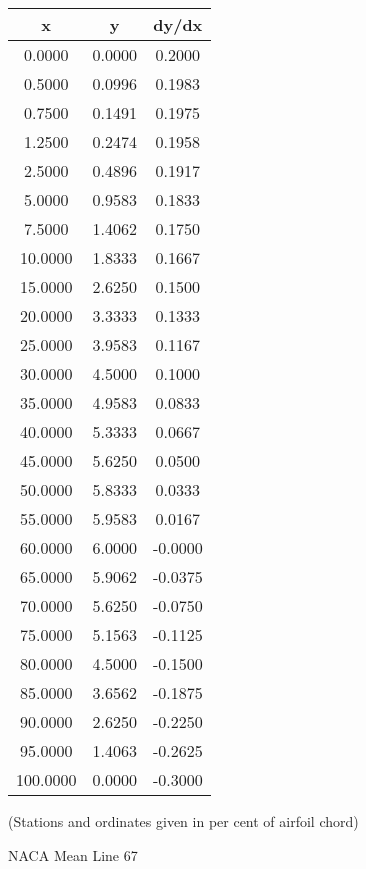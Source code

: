 \documentclass[11pt]{book}
\begin{document}
 \vspace{8mm}
 \begin{tabular}{|c|c|c|}  \hline
 x & y & dy/dx \\
 \hline
0.0000 & 0.0000 & 0.2000 \\
0.5000 & 0.0996 & 0.1983 \\
0.7500 & 0.1491 & 0.1975 \\
1.2500 & 0.2474 & 0.1958 \\
2.5000 & 0.4896 & 0.1917 \\
5.0000 & 0.9583 & 0.1833 \\
7.5000 & 1.4062 & 0.1750 \\
10.0000 & 1.8333 & 0.1667 \\
15.0000 & 2.6250 & 0.1500 \\
20.0000 & 3.3333 & 0.1333 \\
25.0000 & 3.9583 & 0.1167 \\
30.0000 & 4.5000 & 0.1000 \\
35.0000 & 4.9583 & 0.0833 \\
40.0000 & 5.3333 & 0.0667 \\
45.0000 & 5.6250 & 0.0500 \\
50.0000 & 5.8333 & 0.0333 \\
55.0000 & 5.9583 & 0.0167 \\
60.0000 & 6.0000 & -0.0000 \\
65.0000 & 5.9062 & -0.0375 \\
70.0000 & 5.6250 & -0.0750 \\
75.0000 & 5.1563 & -0.1125 \\
80.0000 & 4.5000 & -0.1500 \\
85.0000 & 3.6562 & -0.1875 \\
90.0000 & 2.6250 & -0.2250 \\
95.0000 & 1.4063 & -0.2625 \\
100.0000 & 0.0000 & -0.3000 \\
 \hline
 \end{tabular}
 \vspace{8mm}

(Stations and ordinates given in per cent of airfoil chord)

 \newpage
 \label{ml67}
 \begin{Large}
 NACA Mean Line 67
 \end{Large}
  
\end{document}
